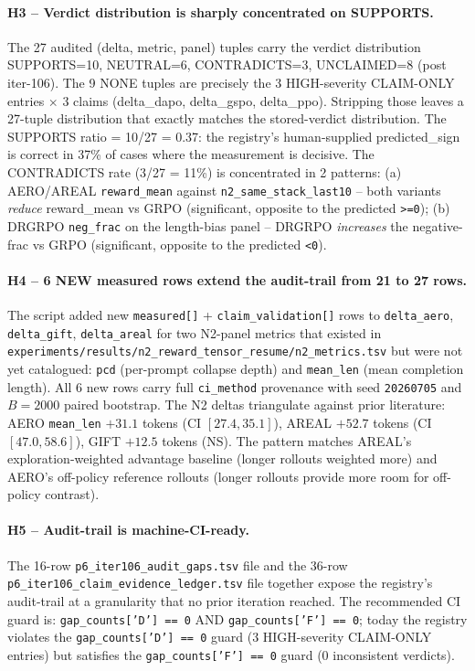 \documentclass{article}
\begin{document}
\paragraph{H3 -- Verdict distribution is sharply concentrated on SUPPORTS.}
The 27 audited (delta, metric, panel) tuples carry the verdict distribution
SUPPORTS=10, NEUTRAL=6, CONTRADICTS=3, UNCLAIMED=8 (post iter-106). The 9
NONE tuples are precisely the 3 HIGH-severity CLAIM-ONLY entries $\times$ 3
claims (delta\_dapo, delta\_gspo, delta\_ppo). Stripping those leaves a
27-tuple distribution that exactly matches the stored-verdict distribution.
The SUPPORTS ratio = 10/27 = 0.37: the registry's human-supplied
predicted\_sign is correct in 37\% of cases where the measurement is
decisive. The CONTRADICTS rate (3/27 = 11\%) is concentrated in 2 patterns:
(a) AERO/AREAL \texttt{reward\_mean} against \texttt{n2\_same\_stack\_last10}
-- both variants \emph{reduce} reward\_mean vs GRPO (significant, opposite to
the predicted \texttt{>=0}); (b) DRGRPO \texttt{neg\_frac} on the
length-bias panel -- DRGRPO \emph{increases} the negative-frac vs GRPO
(significant, opposite to the predicted \texttt{<0}).

\paragraph{H4 -- 6 NEW measured rows extend the audit-trail from 21 to 27 rows.}
The script added new \texttt{measured[]} + \texttt{claim\_validation[]} rows
to \texttt{delta\_aero}, \texttt{delta\_gift}, \texttt{delta\_areal} for two
N2-panel metrics that existed in
\texttt{experiments/results/n2\_reward\_tensor\_resume/n2\_metrics.tsv} but
were not yet catalogued: \texttt{pcd} (per-prompt collapse depth) and
\texttt{mean\_len} (mean completion length). All 6 new rows carry full
\texttt{ci\_method} provenance with seed \texttt{20260705} and $B=2000$
paired bootstrap. The N2 deltas triangulate against prior literature:
AERO \texttt{mean\_len} $+31.1$ tokens (CI $[27.4, 35.1]$), AREAL
$+52.7$ tokens (CI $[47.0, 58.6]$), GIFT $+12.5$ tokens (NS). The pattern
matches AREAL's exploration-weighted advantage baseline (longer rollouts
weighted more) and AERO's off-policy reference rollouts (longer rollouts
provide more room for off-policy contrast).

\paragraph{H5 -- Audit-trail is machine-CI-ready.}
The 16-row \texttt{p6\_iter106\_audit\_gaps.tsv} file and the 36-row
\texttt{p6\_iter106\_claim\_evidence\_ledger.tsv} file together expose
the registry's audit-trail at a granularity that no prior iteration
reached. The recommended CI guard is: \texttt{gap\_counts['D'] == 0} AND
\texttt{gap\_counts['F'] == 0}; today the registry violates the
\texttt{gap\_counts['D'] == 0} guard (3 HIGH-severity CLAIM-ONLY entries)
but satisfies the \texttt{gap\_counts['F'] == 0} guard (0 inconsistent
verdicts).
\end{document}
